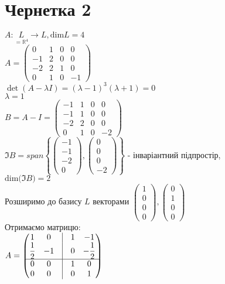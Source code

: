 \documentclass[a4paper, 14pt]{extarticle}
\def\dim#1{\textrm{dim} {#1}}
\begin{document}
\section*{Чернетка 2}
$A: \underset{= \mathbb{R}^4}{L} \to L, \dim L = 4$\\
$A = \begin{pmatrix}
0 & 1 & 0 & 0 \\
-1 & 2 & 0 & 0 \\
-2 & 2 & 1 & 0 \\
0 & 1 & 0 & -1
\end{pmatrix}$\\
$\det(A-\lambda I) = (\lambda - 1)^3(\lambda + 1) = 0$\\
$\lambda = 1$\\
$B = A - I = \begin{pmatrix}
-1 & 1 & 0 & 0 \\
-1 & 1 & 0 & 0 \\
-2 & 2 & 0 & 0 \\
0 & 1 & 0 & -2
\end{pmatrix}$\\
$\Im B = span\left\{ \begin{pmatrix} -1 \\ -1 \\ -2 \\ 0 \end{pmatrix}, \begin{pmatrix} 0 \\ 0 \\ 0 \\ -2 \end{pmatrix} \right\}$ - інваріантний підпростір, \\ $\dim (\Im B) = 2$\\
Розширимо до базису $L$ векторами $\begin{pmatrix} 1 \\ 0 \\ 0 \\ 0 \end{pmatrix}, \begin{pmatrix} 0 \\ 1 \\ 0 \\ 0 \end{pmatrix}$\\
Отримаємо матрицю:\\
$A = \begin{pmatrix}
1 & 0 & \vline & 1 & -1 \\
\dfrac{1}{2} & -1 & \vline & 0 & -\dfrac{1}{2} \\
\hline
0 & 0 & \vline & 1 & 0 \\
0 & 0 & \vline & 0 & 1
\end{pmatrix}$\\
\end{document}
